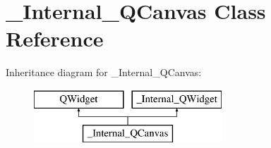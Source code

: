 \hypertarget{class__Internal__QCanvas}{}\section{\+\_\+\+Internal\+\_\+\+Q\+Canvas Class Reference}
\label{class__Internal__QCanvas}
Inheritance diagram for \+\_\+\+Internal\+\_\+\+Q\+Canvas\+:\begin{figure}[H]
\begin{center}
\leavevmode
\includegraphics[height=2.000000cm]{class__Internal__QCanvas}
\end{center}
\end{figure}
